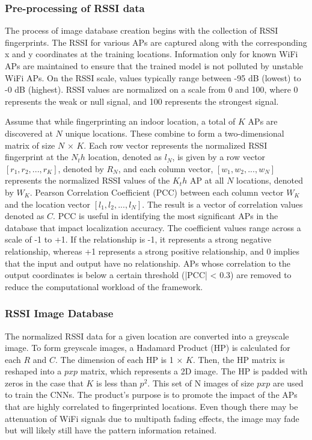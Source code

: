     \subsubsection{Pre-processing of RSSI data} 
    The process of image database creation begins with the collection of RSSI fingerprints. The RSSI for various APs are captured along with the corresponding x and y coordinates at the training locations. Information only for known WiFi APs are maintained to ensure that the trained model is not polluted by unstable WiFi APs. On the RSSI scale, values typically range between -95 dB (lowest) to -0 dB (highest). RSSI values are normalized on a scale from 0 and 100, where 0 represents the weak or null signal, and 100 represents the strongest signal.
        
    Assume that while fingerprinting an indoor location, a total of $K$ APs are discovered at $N$ unique locations. These combine to form a two-dimensional matrix of size $N$ × $K$. Each row vector represents the normalized RSSI fingerprint at the $N_th$ location, denoted as $l_N$, is given by a row vector $[r_1 , r_2, ..., r_K]$, denoted by $R_N$, and each column vector, $[w_1 , w_2 ,..., w_N ]$ represents the normalized RSSI values of the $K_th$ AP at all $N$ locations, denoted by $W_K$. Pearson Correlation Coefficient (PCC) \cite{pcc} between each column vector $W_K$ and the location vector $[l_1 , l_2 , ..., l_N]$. The result is a vector of correlation values denoted as $C$. PCC is useful in identifying the most significant APs in the database that impact localization accuracy. The coefficient values range across a scale of -1 to +1. If the relationship is -1, it represents a strong negative relationship, whereas +1 represents a strong positive relationship, and 0 implies that the input and output have no relationship. APs whose correlation to the output coordinates is below a certain threshold (|PCC| < 0.3) are removed to reduce the computational workload of the framework.
    
    \subsubsection{RSSI Image Database}
    The normalized RSSI data for a given location are converted into a greyscale image. To form greyscale images, a Hadamard Product (HP) \cite{hp} is calculated for each $R$ and $C$. The dimension of each HP is 1 × $K$. Then, the HP matrix is reshaped into a $p x p$ matrix, which represents a 2D image. The HP is padded with zeros in the case that $K$ is less than $p^2$. This set of N images of size $p x p$ are used to train the CNNs. The product's purpose is to promote the impact of the APs that are highly correlated to fingerprinted locations. Even though there may be attenuation of WiFi signals due to multipath fading effects, the image may fade but will likely still have the pattern information retained.
    
